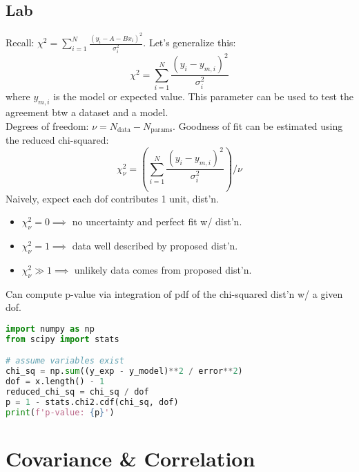 \documentclass[twocolumn]{article}
\begin{document}
\subsection{Lab}
Recall: $\chi^2 = \sum_{i=1}^N \frac{(y_i - A - Bx_i)^2}{\sigma_i^2}$. Let's generalize this:
\begin{equation*}
    \chi^2 = \sum_{i=1}^N \frac{(y_i - y_{m,i})^2}{\sigma_i^2}
\end{equation*}
where $y_{m,i}$ is the model or expected value. This parameter can be used to test the agreement btw a dataset and a model. \\

Degrees of freedom: $\nu = N_{\text{data}} - N_{\text{params}}$. Goodness of fit can be estimated using the reduced chi-squared:
\begin{equation}
    \chi_\nu^2 = \left( \sum_{i=1}^N \frac{(y_i - y_{m,i})^2}{\sigma_i^2} \right) / \nu
\end{equation}
Naively, expect each dof contributes 1 unit, dist'n.
\begin{itemize}
    \item $\chi_\nu^2 = 0 \implies$ no uncertainty and perfect fit w/ dist'n.
    \item $\chi_\nu^2 = 1 \implies$ data well described by proposed dist'n.
    \item $\chi_\nu^2 \gg 1 \implies$ unlikely data comes from proposed dist'n.
\end{itemize}
Can compute p-value via integration of pdf of the chi-squared dist'n w/ a given dof.

\begin{lstlisting}[language=python]
import numpy as np
from scipy import stats

# assume variables exist
chi_sq = np.sum((y_exp - y_model)**2 / error**2)
dof = x.length() - 1
reduced_chi_sq = chi_sq / dof
p = 1 - stats.chi2.cdf(chi_sq, dof)
print(f'p-value: {p}')
\end{lstlisting}


\section{Covariance \& Correlation}
\end{document}
